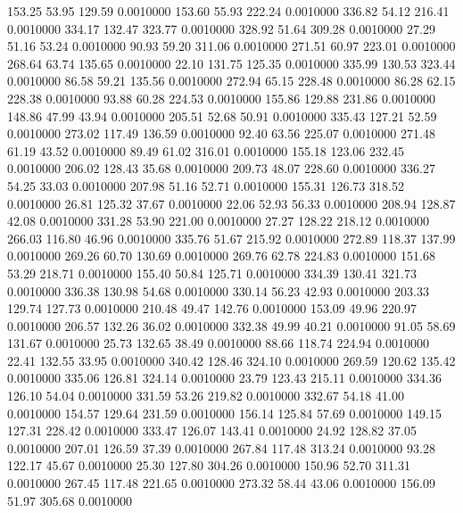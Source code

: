  153.25   53.95  129.59   0.0010000
 153.60   55.93  222.24   0.0010000
 336.82   54.12  216.41   0.0010000
 334.17  132.47  323.77   0.0010000
 328.92   51.64  309.28   0.0010000
  27.29   51.16   53.24   0.0010000
  90.93   59.20  311.06   0.0010000
 271.51   60.97  223.01   0.0010000
 268.64   63.74  135.65   0.0010000
  22.10  131.75  125.35   0.0010000
 335.99  130.53  323.44   0.0010000
  86.58   59.21  135.56   0.0010000
 272.94   65.15  228.48   0.0010000
  86.28   62.15  228.38   0.0010000
  93.88   60.28  224.53   0.0010000
 155.86  129.88  231.86   0.0010000
 148.86   47.99   43.94   0.0010000
 205.51   52.68   50.91   0.0010000
 335.43  127.21   52.59   0.0010000
 273.02  117.49  136.59   0.0010000
  92.40   63.56  225.07   0.0010000
 271.48   61.19   43.52   0.0010000
  89.49   61.02  316.01   0.0010000
 155.18  123.06  232.45   0.0010000
 206.02  128.43   35.68   0.0010000
 209.73   48.07  228.60   0.0010000
 336.27   54.25   33.03   0.0010000
 207.98   51.16   52.71   0.0010000
 155.31  126.73  318.52   0.0010000
  26.81  125.32   37.67   0.0010000
  22.06   52.93   56.33   0.0010000
 208.94  128.87   42.08   0.0010000
 331.28   53.90  221.00   0.0010000
  27.27  128.22  218.12   0.0010000
 266.03  116.80   46.96   0.0010000
 335.76   51.67  215.92   0.0010000
 272.89  118.37  137.99   0.0010000
 269.26   60.70  130.69   0.0010000
 269.76   62.78  224.83   0.0010000
 151.68   53.29  218.71   0.0010000
 155.40   50.84  125.71   0.0010000
 334.39  130.41  321.73   0.0010000
 336.38  130.98   54.68   0.0010000
 330.14   56.23   42.93   0.0010000
 203.33  129.74  127.73   0.0010000
 210.48   49.47  142.76   0.0010000
 153.09   49.96  220.97   0.0010000
 206.57  132.26   36.02   0.0010000
 332.38   49.99   40.21   0.0010000
  91.05   58.69  131.67   0.0010000
  25.73  132.65   38.49   0.0010000
  88.66  118.74  224.94   0.0010000
  22.41  132.55   33.95   0.0010000
 340.42  128.46  324.10   0.0010000
 269.59  120.62  135.42   0.0010000
 335.06  126.81  324.14   0.0010000
  23.79  123.43  215.11   0.0010000
 334.36  126.10   54.04   0.0010000
 331.59   53.26  219.82   0.0010000
 332.67   54.18   41.00   0.0010000
 154.57  129.64  231.59   0.0010000
 156.14  125.84   57.69   0.0010000
 149.15  127.31  228.42   0.0010000
 333.47  126.07  143.41   0.0010000
  24.92  128.82   37.05   0.0010000
 207.01  126.59   37.39   0.0010000
 267.84  117.48  313.24   0.0010000
  93.28  122.17   45.67   0.0010000
  25.30  127.80  304.26   0.0010000
 150.96   52.70  311.31   0.0010000
 267.45  117.48  221.65   0.0010000
 273.32   58.44   43.06   0.0010000
 156.09   51.97  305.68   0.0010000
